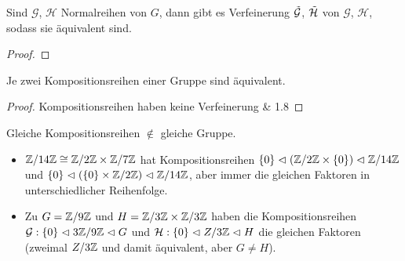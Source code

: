 \documentclass[../main.tex]{subfiles}
\begin{document}
\begin{theorem}
    Sind $\mathcal{G}$, $\mathcal{H}$ Normalreihen von $G$, dann gibt es Verfeinerung $\Tilde{\mathcal{G}}$, $\Tilde{\mathcal{H}}$ von $\mathcal{G}$, $\mathcal{H}$, sodass sie äquivalent sind.
\end{theorem}
\begin{proof}
    \TODO
\end{proof}

\begin{theorem}
    Je zwei Kompositionsreihen einer Gruppe sind äquivalent.
\end{theorem}
\begin{proof}
    Kompositionsreihen haben keine Verfeinerung \& 1.8
\end{proof}
\begin{remark*}
    Gleiche Kompositionsreihen $\notin$ gleiche Gruppe.
\end{remark*}
\begin{example*}
    \begin{itemize}
        \item $\mathbb{Z}/14\mathbb{Z} \cong \mathbb{Z}/2\mathbb{Z} \times \mathbb{Z}/7\mathbb{Z}$ hat Kompositionsreihen $\{0\} \vartriangleleft (\mathbb{Z}/2\mathbb{Z} \times \{0\}) \vartriangleleft \mathbb{Z}/14\mathbb{Z}$ und $\{0\} \vartriangleleft (\{0\} \times \mathbb{Z}/2\mathbb{Z}) \vartriangleleft \mathbb{Z}/14\mathbb{Z}$, aber immer die gleichen Faktoren in unterschiedlicher Reihenfolge.
        \item Zu $G=\mathbb{Z}/9\mathbb{Z}$ und $H=\mathbb{Z}/3\mathbb{Z}\times\mathbb{Z}/3\mathbb{Z}$ haben die Kompositionsreihen $\mathcal{G}: \{0\} \vartriangleleft 3 \mathbb{Z}/9\mathbb{Z} \vartriangleleft G$ und $\mathcal{H}: \{0\} \vartriangleleft Z/3\mathbb{Z} \vartriangleleft H$ die gleichen Faktoren (zweimal $Z/3\mathbb{Z}$ und damit äquivalent, aber $G\neq H$).
    \end{itemize}
\end{example*}
    
\end{document}
